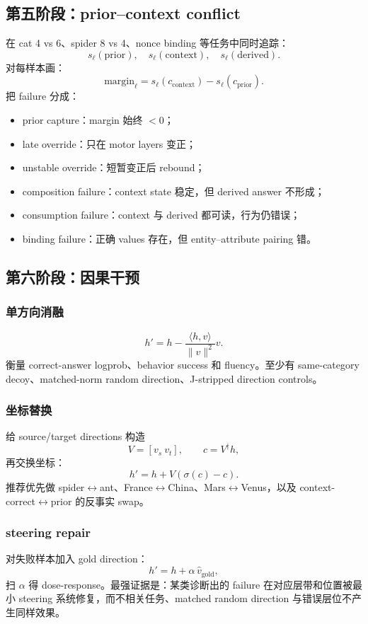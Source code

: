 \documentclass[10.5pt,a4paper]{ctexart}
\begin{document}
\subsection{第五阶段：prior--context conflict}
在 cat 4 vs 6、spider 8 vs 4、nonce binding 等任务中同时追踪：
\[
s_\ell(\mathrm{prior}),\quad
s_\ell(\mathrm{context}),\quad
s_\ell(\mathrm{derived}).
\]
对每样本画：
\[
\mathrm{margin}_\ell
=s_\ell(c_{\mathrm{context}})-s_\ell(c_{\mathrm{prior}}).
\]
把 failure 分成：
\begin{itemize}
  \item prior capture：margin 始终 $<0$；
  \item late override：只在 motor layers 变正；
  \item unstable override：短暂变正后 rebound；
  \item composition failure：context state 稳定，但 derived answer 不形成；
  \item consumption failure：context 与 derived 都可读，行为仍错误；
  \item binding failure：正确 values 存在，但 entity--attribute pairing 错。
\end{itemize}

\subsection{第六阶段：因果干预}
\subsubsection{单方向消融}
\[
h'
=
h-
\frac{\langle h,v\rangle}{\|v\|^2}v.
\]
衡量 correct-answer logprob、behavior success 和 fluency。至少有 same-category decoy、matched-norm random direction、J-stripped direction controls。

\subsubsection{坐标替换}
给 source/target directions 构造
\[
V=[v_s\ v_t],\qquad c=V^\dagger h,
\]
再交换坐标：
\[
h'=h+V(\sigma(c)-c).
\]
推荐优先做 spider$\leftrightarrow$ant、France$\leftrightarrow$China、Mars$\leftrightarrow$Venus，以及 context-correct$\leftrightarrow$prior 的反事实 swap。

\subsubsection{steering repair}
对失败样本加入 gold direction：
\[
h'=h+\alpha\,\hat v_{\mathrm{gold}},
\]
扫 \(\alpha\) 得 dose-response。最强证据是：某类诊断出的 failure 在对应层带和位置被最小 steering 系统修复，而不相关任务、matched random direction 与错误层位不产生同样效果。
\end{document}

